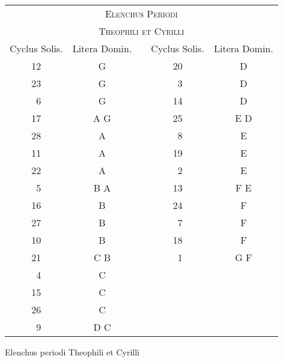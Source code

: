 %
\begin{tabnums} %
\normalsize
\centering
%
\newcommand{\cwd}{4.0em}
\newcommand{\da}{{\scriptsize †}}
\newcommand{\db}{{\scriptsize ‡}}
\newcommand{\ang}{90}
\newcommand{\hsa}[1]{\footnotesize{#1}}
\newcommand{\hsb}[1]{\scriptsize{#1}}
%
\newcommand{\hdrB}{%
 \multicolumn{1}{c}{\hsb{\parbox[b]{\cwd}{\raggedright Cyclus Solis.}}} &
 \multicolumn{1}{c}{\hsb{\parbox[b]{\cwd}{\raggedright Litera Domin.}}}
}
%
\newcommand{\hdrs}{%
 \hdrB & \hspace*{1em} & \hdrB \\
 \cmidrule(l){1-2} \cmidrule(l){4-5}
}
%
\begin{tabular}[c]{@{} cc c cc @{}}
\toprule
\multicolumn{5}{c}{\Large\textsc{Elenchus Periodi}} \\
\multicolumn{5}{c}{\large\textsc{Theophili et Cyrilli}} \\
\toprule
 \hdrs %
  12 &  G  && 20 &  D \\
  23 &  G  && ~3 &  D \\
  ~6 &  G  && 14 &  D \\
  17 & A G && 25 & E D \\
  28 &  A  && ~8 &  E \\
  11 &  A  && 19 &  E \\
  22 &  A  && ~2 &  E \\
  ~5 & B A && 13 & F E \\
  16 &  B  && 24 &  F \\
  27 &  B  && ~7 &  F \\
  10 &  B  && 18 &  F \\
  21 & C B && ~1 & G F \\
  ~4 &  C  && \\
  15 &  C  && \\
  26 &  C  && \\
  ~9 & D C && \\
\bottomrule
\end{tabular}
\caption{Elenchus periodi Theophili et Cyrilli}
\label{tab:p158}
\end{tabnums}
